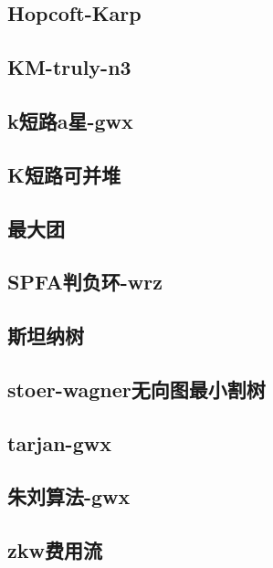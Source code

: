 \documentclass[titlepage,a4paper,10pt]{article}
\begin{document}
\begin{spacing}{0.8}
			\subsection{Hopcoft-Karp}
				
			\subsection{KM-truly-n3}
				
			\subsection{k短路a星-gwx}
				
			\subsection{K短路可并堆}
				
			\subsection{最大团}
				
			\subsection{SPFA判负环-wrz}
				
			\subsection{斯坦纳树}
				
			\subsection{stoer-wagner无向图最小割树}
				
			\subsection{tarjan-gwx}
				
			\subsection{朱刘算法-gwx}
				
			\subsection{zkw费用流}
				

\end{spacing}
\end{document}
